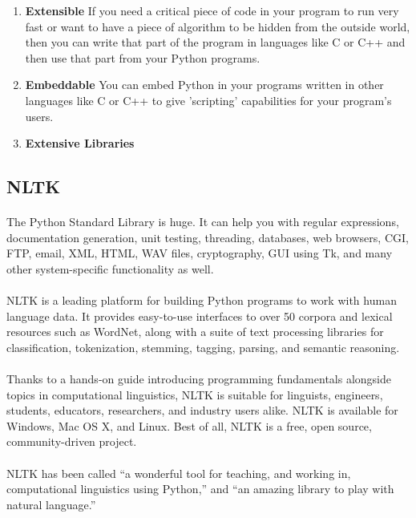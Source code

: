 \begin{enumerate}[1. ]
\item \textbf{Extensible} \newline If you need a critical piece of code in your program to run very fast or want to have a piece of algorithm to be hidden from the outside world, then you can write that part of the program in languages like C or C++ and then use that part from your Python programs.
\item \textbf{Embeddable} \newline You can embed Python in your programs written in other languages like C or C++ to give 'scripting' capabilities for your program's users.
\item \textbf{Extensive Libraries}
\end{enumerate}
\subsection{NLTK}
\paragraph{} The Python Standard Library is huge. It can help you with regular expressions, documentation generation, unit testing, threading, databases, web browsers, CGI, FTP, email, XML, HTML, WAV files, cryptography, GUI using Tk, and  many other system-specific functionality as well.
\paragraph{} NLTK is a leading platform for building Python programs to work with human language data. It provides easy-to-use interfaces to over 50 corpora and lexical resources such as WordNet, along with a suite of text processing libraries for classification, tokenization, stemming, tagging, parsing, and semantic reasoning.
\paragraph{} Thanks to a hands-on guide introducing programming fundamentals alongside topics in computational linguistics, NLTK is suitable for linguists, engineers, students, educators, researchers, and industry users alike. NLTK is available for Windows, Mac OS X, and Linux. Best of all, NLTK is a free, open source, community-driven project. 
\paragraph{} NLTK has been called “a wonderful tool for teaching, and working in, computational linguistics using Python,” and “an amazing library to play with natural language.”
